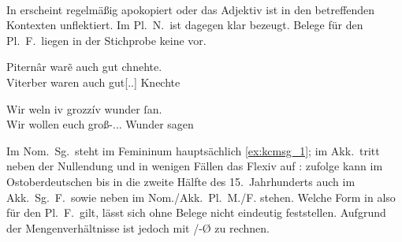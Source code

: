 \paragraph{\citet{kc:M}}
In \citet{kc:M} erscheint  regelmäßig apokopiert oder das Adjektiv ist
in den betreffenden Kontexten unflektiert. Im Pl.\ N.\ ist dagegen klar
 bezeugt. Belege für den Pl.\ F.\ liegen in der Stichprobe
keine vor.

\begin{exe}
\ex \label{ex:kcmpl}
	\begin{xlist}
	\ex \label{ex:kcmpl_1}
		\gll Piternâr warẽ auch gut chnehte. \\
			Viterber waren auch gut[\Nom.\Pl.\MascM] Knechte \\
		\begin{taggedline}{\parencites[\pno~32\vb, 34]{kc:M}[vgl.][4383]{schroeder1895}}
		\trans {}
		\end{taggedline}

	\ex \label{ex:kcmpl_2}
		\gll Wir weln iv grozzív wunder ſan. \\
			Wir wollen euch groß-\Acc.\Pl.\NeutI.\St{} Wunder sagen \\
		\begin{taggedline}{\parencites[\pno~14\va, 10]{kc:M}[vgl.][1839]{schroeder1895}}
		\trans {}
		\end{taggedline}
	\end{xlist}
\end{exe}

Im Nom.\ Sg.\ steht im Femininum hauptsächlich  \cref{ex:kcmsg_1}; im
Akk.\ tritt neben der Nullendung und  in wenigen Fällen das Flexiv
 auf :
\citet[191--192]{reichmannwegera1993} zufolge kann im Ostoberdeutschen bis in die
zweite Hälfte des 15.~Jahrhunderts  auch im Akk.\ Sg.\ F.\ sowie
 neben  im Nom./Akk.\ Pl.\ M./F. stehen. Welche Form in
\citet{kc:M} also für den Pl.\ F.\ gilt, lässt sich ohne Belege nicht eindeutig
feststellen. Aufgrund der Mengenverhältnisse ist jedoch mit /-Ø zu
rechnen.

